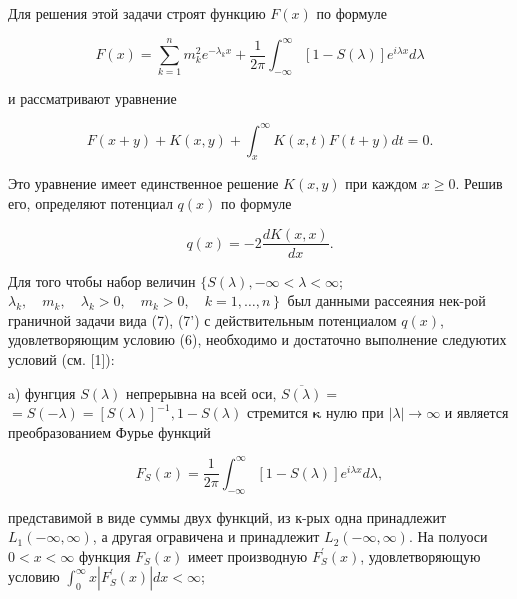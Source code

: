 \documentclass[10pt]{article}
\begin{document}
Для решения этой задачи строят функцию $F(x)$ по формуле



\[

F(x)=\sum_{k=1}^{n} m_{k}^{2} e^{-\lambda_{k} x}+\frac{1}{2 \pi} \int_{-\infty}^{\infty}[1-S(\lambda)] e^{i \lambda x} d \lambda

\]



и рассматривают уравнение



\[

F(x+y)+K(x, y)+\int_{x}^{\infty} K(x, t) F(t+y) d t=0 .

\]



Это уравнение имеет единственное решение $K(x, y)$ при каждом $x \geqslant 0$. Решив его, определяют потенциал $q(x)$ по формуле



\[

q(x)=-2 \frac{d K(x, x)}{d x} .

\]



Для того чтобы набор величин $\{S(\lambda),-\infty<\lambda<\infty$; $\left.\lambda_{k}, \quad m_{k}, \quad \lambda_{k}>0, \quad m_{k}>0, \quad k=1, \ldots, n\right\}$ был данными рассеяния нек-рой граничной задачи вида (7), (7') с действительным потенциалом $q(x)$, удовлетворяющим условию (6), необходимо и достаточно выполнение следуютих условий (см. [1]):



a) фунгция $S(\lambda)$ непрерывна на всей оси, $\overline{S(\lambda)}=$ $=S(-\lambda)=[S(\lambda)]^{-1}, 1-S(\lambda)$ стремится $\mathbf{\kappa}$ нулю при $|\lambda| \rightarrow \infty$ и является преобразованием Фурье функций



\[

F_{S}(x)=\frac{1}{2 \pi} \int_{-\infty}^{\infty}[1-S(\lambda)] e^{i \lambda x} d \lambda,

\]



представимой в виде суммы двух функций, из к-рых одна принадлежит $L_{1}(-\infty, \infty)$, а другая огравичена и принадлежит $L_{2}(-\infty, \infty)$. На полуоси $0<x<\infty$ функция $F_{S}(x)$ имеет производную $F_{S}^{\prime}(x)$, удовлетворяющую условию $\int_{0}^{\infty} x\left|F_{S}^{\prime}(x)\right| d x<\infty$;
\end{document}
